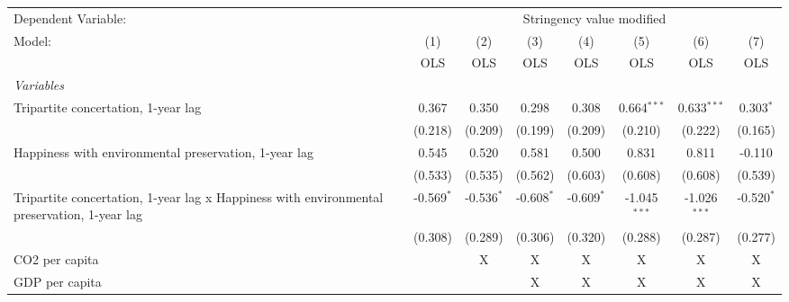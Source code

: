 
\begingroup
\centering
\begin{tabular}{lccccccc}
   \toprule
   Dependent Variable: & \multicolumn{7}{c}{Stringency value modified}\\
   Model:                                                                                      & (1)          & (2)          & (3)          & (4)          & (5)            & (6)            & (7)\\  
                                                                                               &  OLS         & OLS          & OLS          & OLS          & OLS            & OLS            & OLS\\  
   \midrule
   \emph{Variables}\\
   Tripartite concertation, 1-year lag                                                         & 0.367        & 0.350        & 0.298        & 0.308        & 0.664$^{***}$  & 0.633$^{***}$  & 0.303$^{*}$\\   
                                                                                               & (0.218)      & (0.209)      & (0.199)      & (0.209)      & (0.210)        & (0.222)        & (0.165)\\   
   Happiness with environmental preservation, 1-year lag                                       & 0.545        & 0.520        & 0.581        & 0.500        & 0.831          & 0.811          & -0.110\\   
                                                                                               & (0.533)      & (0.535)      & (0.562)      & (0.603)      & (0.608)        & (0.608)        & (0.539)\\   
   Tripartite concertation, 1-year lag x Happiness with environmental preservation, 1-year lag & -0.569$^{*}$ & -0.536$^{*}$ & -0.608$^{*}$ & -0.609$^{*}$ & -1.045$^{***}$ & -1.026$^{***}$ & -0.520$^{*}$\\   
                                                                                               & (0.308)      & (0.289)      & (0.306)      & (0.320)      & (0.288)        & (0.287)        & (0.277)\\   
   CO2 per capita                                                                              &              & X            & X            & X            & X              & X              & X\\  
   GDP per capita                                                                              &              &              & X            & X            & X              & X              & X\\  

\end{tabular}
